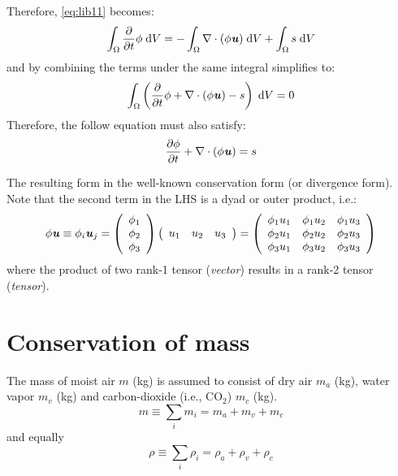 Therefore, \cref{eq:lib11} becomes:
\begin{equation}
\int_{\Omega}  \frac{\partial}{\partial t}\phi\;\mathrm{d}V = -\int_{\Omega} \nabla \cdot (\phi\textbf{\textit{u}})\;\mathrm{d}V + \int_{\Omega} s\;\mathrm{d}V
\end{equation}
and by combining the terms under the same integral simplifies to:
\begin{equation}
\int_{\Omega}  \left(\frac{\partial}{\partial t}\phi + \nabla \cdot (\phi\textbf{\textit{u}}) - s\right)\;\mathrm{d}V = 0
\end{equation}
Therefore, the follow equation must also satisfy:
\begin{equation}
\frac{\partial \phi}{\partial t} + \nabla \cdot (\phi\textbf{\textit{u}}) = s
\end{equation}

The resulting form in the well-known conservation form (or divergence form). Note that the second term in the LHS is a dyad or outer product, i.e.:
\begin{equation}
\phi {\mvec{u}} \equiv {\phi _i}{\mvec{u}_j} = \left( {\begin{array}{*{20}{c}}
{{\phi _1}}\\
{{\phi _2}}\\
{{\phi _3}}
\end{array}} \right)\left( {\begin{array}{*{20}{c}}
{{u_1}}&{{u_2}}&{{u_3}}
\end{array}} \right) = \left( {\begin{array}{*{20}{c}}
{{\phi _1}{u_1}}&{{\phi _1}{u_2}}&{{\phi _1}{u_3}}\\
{{\phi _2}{u_1}}&{{\phi _2}{u_2}}&{{\phi _2}{u_3}}\\
{{\phi _3}{u_1}}&{{\phi _3}{u_2}}&{{\phi _3}{u_3}}
\end{array}} \right)
\end{equation}
where the product of two rank-1 tensor (\textit{vector}) results in a rank-2 tensor (\textit{tensor}).

\newpage

\section{Conservation of mass}
\label{sec:conservationofmass}

The mass of moist air $m$ (kg) is assumed to consist of dry air $m_a$ (kg), water vapor $m_v$ (kg) and carbon-dioxide (i.e., CO$_2$) $m_{c}$ (kg).
\begin{equation}
m \equiv \sum_i m_i = m_a + m_v + m_{c}
\end{equation}
and equally
\begin{equation}
\rho \equiv \sum_i \rho_i = \rho_a + \rho_v + \rho_{c}
\end{equation}

